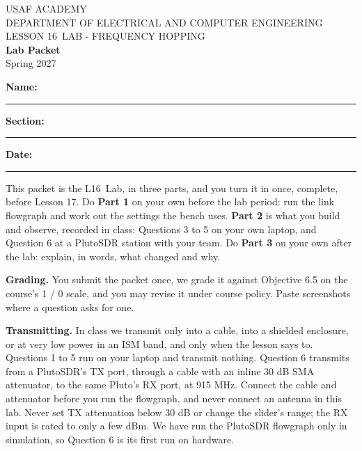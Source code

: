 \documentclass{exam}
\def\labLesson{16}
\def\thisterm{\thisTermIn}
\def\thisterm{Spring 2027}
\begin{document}
\pagestyle{headandfoot}   %


\begin{center}
USAF ACADEMY \\
DEPARTMENT OF ELECTRICAL AND COMPUTER ENGINEERING \\
LESSON \labLesson\ LAB - FREQUENCY HOPPING \\
\textbf{Lab Packet} \\
\thisterm \\[4mm]
\end{center}

\vspace{-4pt}
\textbf{Name:} \rule[-2pt]{2.6in}{0.4pt} \hfill
\textbf{Section:} \rule[-2pt]{0.9in}{0.4pt} \hfill
\textbf{Date:} \rule[-2pt]{1.1in}{0.4pt}

\vspace{4pt}


\vspace{2pt}

This packet is the L\labLesson\ Lab, in three parts, and you turn it in once, complete,
before Lesson 17. Do \textbf{Part 1} on your own before the lab period: run the link
flowgraph and work out the settings the bench uses. \textbf{Part 2} is what you
build and observe, recorded in class: Questions 3 to 5 on your own laptop, and
Question 6 at a PlutoSDR station with your team. Do \textbf{Part 3} on your own after
the lab: explain, in words, what changed and why.

\textbf{Grading.} You submit the packet once, we grade it against Objective 6.5 on
the course's 1 / 0 scale, and you may revise it under course policy. Paste screenshots where a
question asks for one.

\textbf{Transmitting.} In class we transmit only into a cable, into a shielded
enclosure, or at very low power in an ISM band, and only when the lesson says to.
Questions 1 to 5 run on your laptop and transmit nothing. Question 6 transmits from a
PlutoSDR's TX port, through a cable with an inline 30 dB SMA attenuator, to the same
Pluto's RX port, at 915 MHz. Connect the cable and attenuator before you run the
flowgraph, and never connect an antenna in this lab. Never set TX attenuation below
30 dB or change the slider's range; the RX input is rated to only a few dBm. We have
run the PlutoSDR flowgraph only in simulation, so Question 6 is its first run on
hardware.
\end{document}

